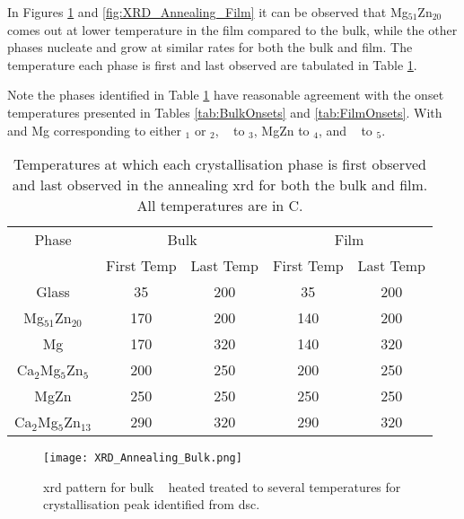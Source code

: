 \documentclass[a4paper,12pt,oneside]{article}%
\begin{document}
In Figures \ref{fig:XRD_Annealing_Bulk} and \ref{fig:XRD_Annealing_Film} it can be observed that Mg$_{51}$Zn$_{20}$ comes out at lower temperature in the film compared to the bulk, while the other phases nucleate and grow at similar rates for both the bulk and film. The temperature each phase is first and last observed are tabulated in Table \ref{tab:Crystal_Sequence}. 

Note the phases identified in Table \ref{tab:Crystal_Sequence} have reasonable agreement with the onset temperatures presented in Tables \ref{tab:BulkOnsets} and \ref{tab:FilmOnsets}. With \MgZn~ and Mg corresponding to either \Tx $_{1}$ or \Tx $_{2}$, \CaMgZnFive~ to \Tx$_{3}$, MgZn to \Tx$_{4}$, and \CaMgZnThirteen~ to \Tx$_{5}$.

\begin{table}[h]
	\centering
	\caption{Temperatures at which each crystallisation phase is first observed and last observed in the annealing \acrshort{xrd} for both the bulk and film. All temperatures are in \degree C.}
	\begin{tabular}{ c c c c c }
		\toprule
		Phase & \multicolumn{2}{c}{Bulk} & \multicolumn{2}{c}{Film}                 \\
		& First Temp & Last Temp & First Temp & Last Temp \\
		\midrule
		Glass 						& 35 & 200 & 35 & 200 \\
		Mg$_{51}$Zn$_{20}$ \cite{Zhang2013, Khan1989} & 170 & 200 & 140 & 200 \\
		Mg 							& 170 & 320 & 140 & 320 \\
		Ca$_{2}$Mg$_{5}$Zn$_{5}$ \cite{Zhang2013, Cao2016} & 200 & 250 & 200 & 250 \\
		MgZn \cite{Khan1989} & 250 & 250 & 250 & 250 \\
		Ca$_{2}$Mg$_{5}$Zn$_{13}$ \cite{Zhang2013, Zhang2012, Zhang2011} & 290 & 320 & 290 & 320 \\
		\bottomrule
	\end{tabular}
	\label{tab:Crystal_Sequence}
\end{table}

\begin{figure}[b]
	\centering
	\texttt{[image: XRD\_Annealing\_Bulk.png]}
	\caption[Table of contents Capition]{\acrshort{xrd} pattern for bulk \MgZnCa~ heated treated to several temperatures for crystallisation peak identified from \acrshort{dsc}.}
	\label{fig:XRD_Annealing_Bulk}
\end{figure}
\end{document}

